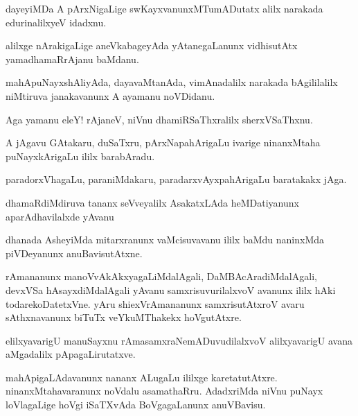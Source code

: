 \documentclass{article}
\begin{document}
\begin{mn}%
dayeyiMDa A pArxNigaLige swKayxvanunxMTumADutatx alilx narakada edurinalilxyeV idadxnu.
\end{mn}

\begin{mn}%
alilxge nArakigaLige aneVkabageyAda yAtanegaLanunx vidhisutAtx yamadhamaRrAjanu baMdanu.
\end{mn}

\begin{mn}%
mahApuNayxshAliyAda, dayavaMtanAda, vimAnadalilx narakada bAgililalilx niMtiruva 
janakavanunx A ayamanu noVDidanu.
\end{mn}

\begin{mn}%
Aga yamanu eleY! rAjaneV, niVnu dhamiRSaThxralilx sherxVSaThxnu.
\end{mn}

\begin{mn}%
A jAgavu GAtakaru, duSaTxru, pArxNapahArigaLu ivarige ninanxMtaha puNayxkArigaLu ililx 
barabAradu.
\end{mn}

\begin{mn}%
paradorxVhagaLu, paraniMdakaru, paradarxvAyxpahArigaLu baratakakx jAga.
\end{mn}

\begin{mn}%
dhamaRdiMdiruva tananx seVveyalilx AsakatxLAda heMDatiyanunx aparAdhavilalxde yAvanu 
\end{mn}

\begin{mn}%
dhanada AsheyiMda mitarxranunx vaMcisuvavanu ililx baMdu naninxMda  piVDeyanunx 
anuBavisutAtxne.
\end{mn}

\begin{mn}%
rAmananunx manoVvAkAkxyagaLiMdalAgali, DaMBAcAradiMdalAgali, devxVSa hAsayxdiMdalAgali 
yAvanu samxrisuvurilalxvoV avanunx ililx hAki todarekoDatetxVne. yAru shiexVrAmananunx 
samxrisutAtxroV avaru sAthxnavanunx biTuTx veYkuMThakekx hoVgutAtxre.
\end{mn}

\begin{mn}%
elilxyavarigU manuSayxnu rAmasamxraNemADuvudilalxvoV alilxyavarigU avana aMgadalilx 
pApagaLirutatxve.
\end{mn}

\begin{mn}%
mahApigaLAdavanunx nananx ALugaLu ililxge karetatutAtxre. ninanxMtahavaranunx noVdalu 
asamathaRru. AdadxriMda niVnu puNayx loVlagaLige hoVgi iSaTXvAda BoVgagaLanunx anuVBavisu.
\end{mn}
\end{document}
